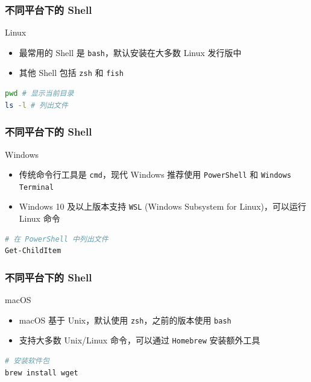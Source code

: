 \documentclass[UTF8, 16pt]{beamer}
\begin{document}
\begin{frame}[fragile]
    \frametitle{不同平台下的 Shell}
    \begin{alertblock}{Linux}
        \begin{itemize}
            \item 最常用的 Shell 是 \texttt{bash}，默认安装在大多数 Linux 发行版中
            \item 其他 Shell 包括 \texttt{zsh} 和 \texttt{fish}
        \end{itemize}
        \begin{lstlisting}[language=bash]
pwd # 显示当前目录
ls -l # 列出文件
        \end{lstlisting}
    \end{alertblock}
\end{frame}

\begin{frame}[fragile]
    \frametitle{不同平台下的 Shell}
    \begin{alertblock}{Windows}
        \begin{itemize}
            \item 传统命令行工具是 \texttt{cmd}，现代 Windows 推荐使用 \texttt{PowerShell} 和 \texttt{Windows Terminal}
            \item Windows 10 及以上版本支持 \texttt{WSL} (Windows Subsystem for Linux)，可以运行 Linux 命令
        \end{itemize}
        \begin{lstlisting}[language=bash]
# 在 PowerShell 中列出文件
Get-ChildItem
        \end{lstlisting}
    \end{alertblock}
\end{frame}

\begin{frame}[fragile]
    \frametitle{不同平台下的 Shell}
    \begin{alertblock}{macOS}
        \begin{itemize}
            \item macOS 基于 Unix，默认使用 \texttt{zsh}，之前的版本使用 \texttt{bash}
            \item 支持大多数 Unix/Linux 命令，可以通过 \texttt{Homebrew} 安装额外工具
        \end{itemize}
        \begin{lstlisting}[language=bash]
# 安装软件包
brew install wget
        \end{lstlisting}
    \end{alertblock}
\end{frame}
\end{document}
